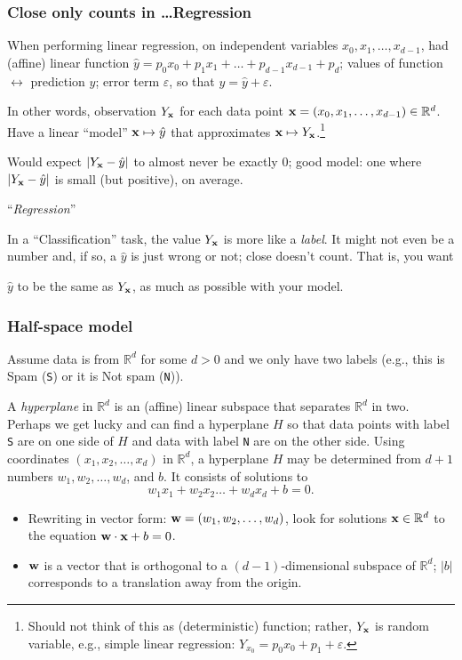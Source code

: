 \documentclass{beamer}
\theoremstyle{example}
\begin{document}
\begin{frame}
\frametitle{Close only counts in \ldots Regression}
When performing linear regression, on independent variables $x_0,x_1,\ldots,x_{d-1}$, had (affine) linear function $\hat{y} = p_0x_0+p_1x_{1}+\ldots+p_{d-1}x_{d-1} + p_d$; \newline 
values of function $\leftrightarrow$ prediction $\hat{y}$; error term $\varepsilon$, so that $y = \hat{y} + \varepsilon$.

\pause
In other words, observation $Y_{\bf x}$ for each data point ${\bf x} = (x_0,x_1,\ldots,x_{d-1}) \in \mathbb R^d$.  Have a linear ``model'' ${\bf x} \mapsto \hat{y}$ that approximates ${\bf x} \mapsto Y_{\bf x}$.\footnote{Should not think of this as (deterministic) function; rather, $Y_{\bf x}$ is random variable, e.g., simple linear regression: $Y_{x_0} = p_0x_0 + p_1 + \varepsilon$.} 

\pause
Would expect $|Y_{\bf x} - \hat{y}|$ to almost never be exactly 0; good model: one where $|Y_{\bf x} - \hat{y}|$ is small (but positive), on average. \newline 
\begin{center}``\emph{Regression}''\end{center}

\pause 
In a ``Classification'' task, the value $Y_{\bf x}$ is more like a \emph{label}. It might not even be a number and, if so, a $\hat{y}$ is just wrong or not; close doesn't count. That is, you want 

$\hat{y}$ to be the same as $Y_{\bf x}$, as much as possible with your model.
\end{frame}

\begin{frame}
\frametitle{Half-space model}
    Assume data is from $\mathbb R^d$ for some $d>0$ and we only have two labels (e.g., this is Spam (\texttt{S}) or it is Not spam (\texttt{N})). 
    \pause

    A \emph{hyperplane} in $\mathbb R^d$ is an (affine) linear subspace that separates $\mathbb R^d$ in two. Perhaps we get lucky and can find a hyperplane $H$ so that data points with label \texttt{S} are on one side of $H$ and data with label \texttt{N} are on the other side.
    \pause
    Using coordinates $(x_1,x_2, \ldots, x_d)$ in $\mathbb R^d$, a hyperplane $H$ may be determined from $d+1$ numbers $w_1,w_2,\ldots,w_d$, and $b$. It consists of solutions to 
        \[w_1x_1 + w_2x_2\ldots + w_dx_d + b = 0.\]

    \begin{itemize}
        \item Rewriting in vector form: ${\bf w}=(w_1,w_2,\ldots,w_d)$, look for solutions ${\bf x}\in\mathbb R^d$ to the equation ${\bf w}\cdot{\bf x} + b = 0$.
        \item ${\bf w}$ is a vector that is orthogonal to a $(d-1)$-dimensional subspace of $\mathbb R^d$; $|b|$ corresponds to a translation away from the origin.
    \end{itemize}

\end{frame}
\end{document}
